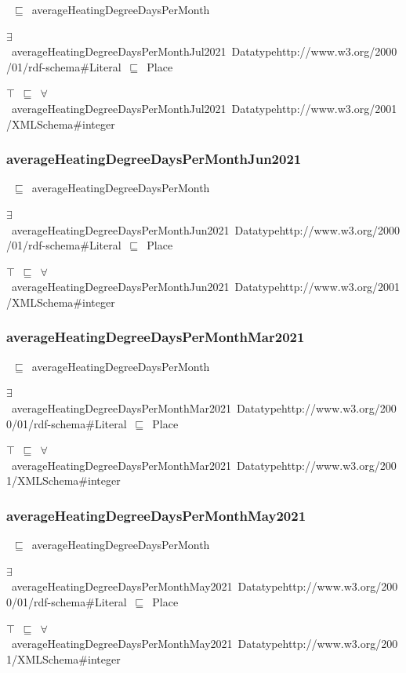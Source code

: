 \documentclass{article}
\begin{document}
~\ensuremath{\sqsubseteq}~averageHeatingDegreeDaysPerMonth

\ensuremath{\exists}~averageHeatingDegreeDaysPerMonthJul2021~Datatypehttp://www.w3.org/2000/01/rdf-schema#Literal~\ensuremath{\sqsubseteq}~Place

\ensuremath{\top}~\ensuremath{\sqsubseteq}~\ensuremath{\forall}~averageHeatingDegreeDaysPerMonthJul2021~Datatypehttp://www.w3.org/2001/XMLSchema#integer

\subsubsection*{averageHeatingDegreeDaysPerMonthJun2021}

~\ensuremath{\sqsubseteq}~averageHeatingDegreeDaysPerMonth

\ensuremath{\exists}~averageHeatingDegreeDaysPerMonthJun2021~Datatypehttp://www.w3.org/2000/01/rdf-schema#Literal~\ensuremath{\sqsubseteq}~Place

\ensuremath{\top}~\ensuremath{\sqsubseteq}~\ensuremath{\forall}~averageHeatingDegreeDaysPerMonthJun2021~Datatypehttp://www.w3.org/2001/XMLSchema#integer

\subsubsection*{averageHeatingDegreeDaysPerMonthMar2021}

~\ensuremath{\sqsubseteq}~averageHeatingDegreeDaysPerMonth

\ensuremath{\exists}~averageHeatingDegreeDaysPerMonthMar2021~Datatypehttp://www.w3.org/2000/01/rdf-schema#Literal~\ensuremath{\sqsubseteq}~Place

\ensuremath{\top}~\ensuremath{\sqsubseteq}~\ensuremath{\forall}~averageHeatingDegreeDaysPerMonthMar2021~Datatypehttp://www.w3.org/2001/XMLSchema#integer

\subsubsection*{averageHeatingDegreeDaysPerMonthMay2021}

~\ensuremath{\sqsubseteq}~averageHeatingDegreeDaysPerMonth

\ensuremath{\exists}~averageHeatingDegreeDaysPerMonthMay2021~Datatypehttp://www.w3.org/2000/01/rdf-schema#Literal~\ensuremath{\sqsubseteq}~Place

\ensuremath{\top}~\ensuremath{\sqsubseteq}~\ensuremath{\forall}~averageHeatingDegreeDaysPerMonthMay2021~Datatypehttp://www.w3.org/2001/XMLSchema#integer
\end{document}
